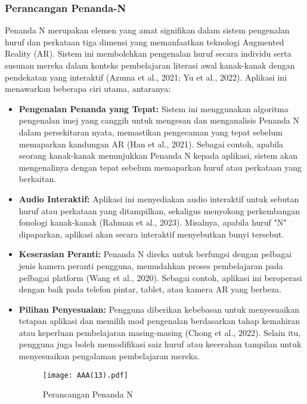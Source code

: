 \begin{itemize}
\begin{itemize}
\begin{itemize}
\begin{itemize}
\subsubsection{Perancangan Penanda-N}  
Penanda N merupakan elemen yang amat signifikan dalam sistem pengenalan huruf dan perkataan tiga dimensi yang memanfaatkan teknologi Augmented Reality (AR). Sistem ini membolehkan pengenalan huruf secara individu serta susunan mereka dalam konteks pembelajaran literasi awal kanak-kanak dengan pendekatan yang interaktif (Azuma et al., 2021; Yu et al., 2022). Aplikasi ini menawarkan beberapa ciri utama, antaranya:  \\  
\begin{itemize}  
\item \textbf{Pengenalan Penanda yang Tepat:} Sistem ini menggunakan algoritma pengenalan imej yang canggih untuk mengesan dan menganalisis Penanda N dalam persekitaran nyata, memastikan pengecaman yang tepat sebelum memaparkan kandungan AR (Han et al., 2021). Sebagai contoh, apabila seorang kanak-kanak menunjukkan Penanda N kepada aplikasi, sistem akan mengenalinya dengan tepat sebelum memaparkan huruf atau perkataan yang berkaitan.\\  
\item \textbf{Audio Interaktif:} Aplikasi ini menyediakan audio interaktif untuk sebutan huruf atau perkataan yang ditampilkan, sekaligus menyokong perkembangan fonologi kanak-kanak (Rahman et al., 2023). Misalnya, apabila huruf "N" dipaparkan, aplikasi akan secara interaktif menyebutkan bunyi tersebut.\\  
\item \textbf{Keserasian Peranti:} Penanda N direka untuk berfungsi dengan pelbagai jenis kamera peranti pengguna, memudahkan proses pembelajaran pada pelbagai platform (Wang et al., 2020). Sebagai contoh, aplikasi ini beroperasi dengan baik pada telefon pintar, tablet, atau kamera AR yang berbeza.\\  
\item \textbf{Pilihan Penyesuaian:} Pengguna diberikan kebebasan untuk menyesuaikan tetapan aplikasi dan memilih mod pengenalan berdasarkan tahap kemahiran atau keperluan pembelajaran masing-masing (Chong et al., 2022). Selain itu, pengguna juga boleh memodifikasi saiz huruf atau kecerahan tampilan untuk menyesuaikan pengalaman pembelajaran mereka.  
  

\begin{figure}
    \centering
    \texttt{[image: AAA(13).pdf]}
    \caption{Perancangan Penanda N}
    \label{fig:enter-label}
\end{figure}


\end{itemize}
\end{itemize}
\end{itemize}
\end{itemize}
\end{itemize}
